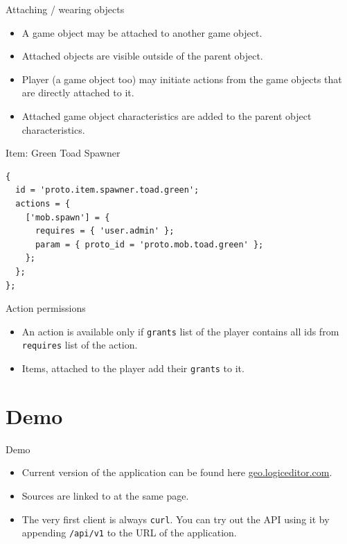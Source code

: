 \documentclass[aspectratio=169,handout,bigger]{beamer}
\begin{document}
\begin{frame}{Attaching / wearing objects}
  \begin{itemize}
    \item A game object may be attached to another game object.
    \item Attached objects are visible outside of the parent object.
    \item Player (a game object too) may initiate actions
          from the game objects that are directly attached to it.
    \item Attached game object characteristics are added to the parent object
          characteristics.
  \end{itemize}
\end{frame}


\begin{frame}[fragile]{Item: Green Toad Spawner}
\begin{verbatim}
{
  id = 'proto.item.spawner.toad.green';
  actions = {
    ['mob.spawn'] = {
      requires = { 'user.admin' };
      param = { proto_id = 'proto.mob.toad.green' };
    };
  };
};
\end{verbatim}
\end{frame}


\begin{frame}{Action permissions}
  \begin{itemize}
    \item An action is available only if \texttt{grants} list of the player
          contains all ids from \texttt{requires} list of the action.
    \item Items, attached to the player add their \texttt{grants} to it.
  \end{itemize}
\end{frame}


\section{Demo}


\begin{frame}{Demo}
  \begin{itemize}
    \item Current version of the application can be found here
          \href{https://geo.logiceditor.com/}{geo.logiceditor.com}.
    \item Sources are linked to at the same page.
    \item The very first client is always \texttt{curl}.
          You can try out the API using it by appending
          \texttt{/api/v1} to the URL of the application.
  \end{itemize}
\end{frame}
\end{document}
